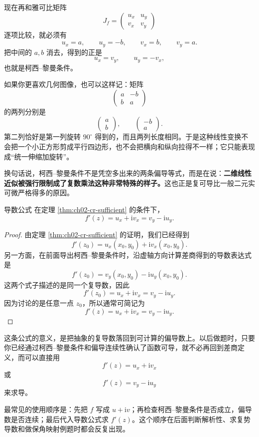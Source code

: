 \begin{tishi}[把 C-R 条件看成矩阵条件]
现在再和雅可比矩阵
\[
    J_f=
    \begin{pmatrix}
        u_x & u_y\\
        v_x & v_y
    \end{pmatrix}
\]
逐项比较，就必须有
\[
    u_x=a,\qquad u_y=-b,\qquad v_x=b,\qquad v_y=a.
\]
把中间的 $a,b$ 消去，得到的正是
\[
    u_x=v_y,\qquad u_y=-v_x,
\]
也就是柯西--黎曼条件。

如果你更喜欢几何图像，也可以这样记：矩阵
\[
    \begin{pmatrix}
        a & -b\\
        b & a
    \end{pmatrix}
\]
的两列分别是
\[
    \begin{pmatrix}
        a\\
        b
    \end{pmatrix},
    \qquad
    \begin{pmatrix}
        -b\\
        a
    \end{pmatrix}.
\]
第二列恰好是第一列旋转 $90^\circ$ 得到的，而且两列长度相同。于是这种线性变换不会把一个小正方形剪成平行四边形，也不会把横向和纵向拉得不一样；它只能表现成``统一伸缩加旋转''。

换句话说，柯西--黎曼条件不是凭空多出来的两条偏导等式，而是在说：\textbf{二维线性近似被强行限制成了复数乘法这种非常特殊的样子。}这也正是复可导比一般二元实可微严格得多的原因。
\end{tishi}

\begin{dingli}{导数公式}{}
在定理 \ref{thm:ch02-cr-sufficient} 的条件下，
\begin{equation}
    f'(z)=u_x+\mathrm{i}v_x=v_y-\mathrm{i}u_y.
\end{equation}
\end{dingli}

\begin{proof}
由定理 \ref{thm:ch02-cr-sufficient} 的证明，我们已经得到
\[
    f'(z_0)=u_x(x_0,y_0)+\mathrm{i}v_x(x_0,y_0).
\]
另一方面，在前面导出柯西--黎曼条件时，沿虚轴方向计算差商得到的导数表达式是
\[
    f'(z_0)=v_y(x_0,y_0)-\mathrm{i}u_y(x_0,y_0).
\]
这两个式子描述的是同一个复导数，因此
\[
    f'(z_0)=u_x+\mathrm{i}v_x=v_y-\mathrm{i}u_y.
\]
因为讨论的是任意一点 $z_0$，所以通常可简记为
\[
    f'(z)=u_x+\mathrm{i}v_x=v_y-\mathrm{i}u_y.
\]
\end{proof}

\begin{tishi}[这个公式什么时候用]
这条公式的意义，是把抽象的复导数落回到可计算的偏导数上。以后做题时，只要你已经通过柯西--黎曼条件和偏导连续性确认了函数可导，就不必再回到差商定义，而可以直接用
\[
    f'(z)=u_x+\mathrm{i}v_x
\]
或
\[
    f'(z)=v_y-\mathrm{i}u_y
\]
来求导。

最常见的使用顺序是：先把 $f$ 写成 $u+\mathrm{i}v$；再检查柯西--黎曼条件是否成立，偏导数是否连续；最后代入导数公式求 $f'(z)$。这个顺序在后面判断解析性、求复势导数和做保角映射例题时都会反复出现。
\end{tishi}

